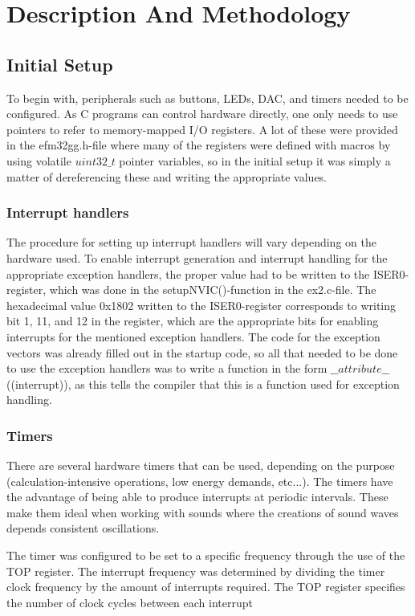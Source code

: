 \section{Description And Methodology}

\subsection{Initial Setup}
To begin with, peripherals such as buttons, LEDs, DAC, and timers needed to be configured. As C programs can control hardware directly, one only needs to use pointers to refer to memory-mapped I/O registers. A lot of these were provided in the efm32gg.h-file where many of the registers were defined with macros by using volatile $uint32\_t$ pointer variables, so in the initial setup it was simply a matter of dereferencing these and writing the appropriate values.

\subsubsection{Interrupt handlers}
The procedure for setting up interrupt handlers will vary depending on the hardware used. To enable interrupt generation and interrupt handling for the appropriate exception handlers, the proper value had to be written to the ISER0-register, which was done in the setupNVIC()-function in the ex2.c-file. The hexadecimal value 0x1802 written to the ISER0-register corresponds to writing bit 1, 11, and 12 in the register, which are the appropriate bits for enabling interrupts for the mentioned exception handlers.
	The code for the exception vectors was already filled out in the startup code, so all that needed to be done to use the exception handlers was to write a function in the form $\_\_attribute\_\_$ ((interrupt)), as this tells the compiler that this is a function used for exception handling.

\subsubsection{Timers}
There are several hardware timers that can be used, depending on the purpose (calculation-intensive operations, low energy demands, etc...). The timers have the advantage of being able to produce interrupts at periodic intervals. These make them ideal when working with sounds where the creations of sound waves depends consistent oscillations. 

The timer was configured to be set to a specific frequency through the use of the TOP register. The interrupt frequency was determined by dividing the timer clock frequency by the amount of interrupts required. The TOP register specifies the number of clock cycles between each interrupt

